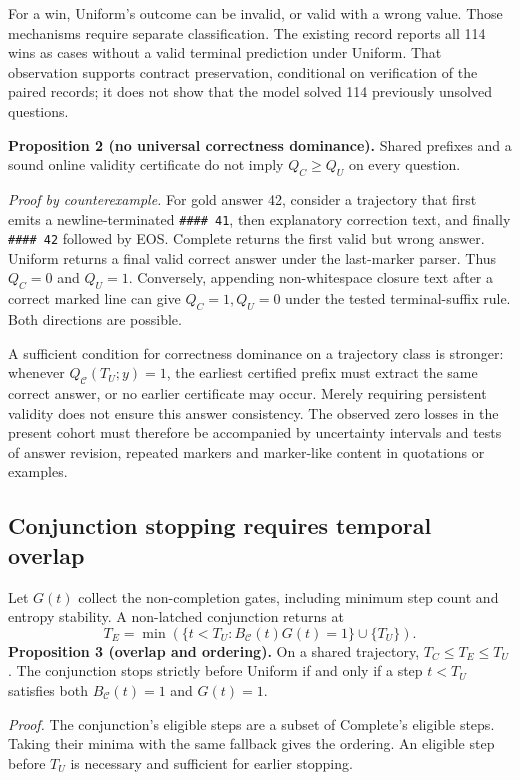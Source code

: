 \documentclass[12pt,a4paper]{article}
\begin{document}
For a win, Uniform's outcome can be invalid, or valid with a wrong value. Those mechanisms require separate classification. The existing record reports all 114 wins as cases without a valid terminal prediction under Uniform. That observation supports contract preservation, conditional on verification of the paired records; it does not show that the model solved 114 previously unsolved questions.

\textbf{Proposition 2 (no universal correctness dominance).} Shared prefixes and a sound online validity certificate do not imply $Q_C\geq Q_U$ on every question.

\emph{Proof by counterexample.} For gold answer 42, consider a trajectory that first emits a newline-terminated \texttt{\#\#\#\# 41}, then explanatory correction text, and finally \texttt{\#\#\#\# 42} followed by EOS. Complete returns the first valid but wrong answer. Uniform returns a final valid correct answer under the last-marker parser. Thus $Q_C=0$ and $Q_U=1$. Conversely, appending non-whitespace closure text after a correct marked line can give $Q_C=1,Q_U=0$ under the tested terminal-suffix rule. Both directions are possible.

A sufficient condition for correctness dominance on a trajectory class is stronger: whenever $Q_{\mathcal C}(T_U;y)=1$, the earliest certified prefix must extract the same correct answer, or no earlier certificate may occur. Merely requiring persistent validity does not ensure this answer consistency. The observed zero losses in the present cohort must therefore be accompanied by uncertainty intervals and tests of answer revision, repeated markers and marker-like content in quotations or examples.

\subsection{Conjunction stopping requires temporal overlap}
Let $G(t)$ collect the non-completion gates, including minimum step count and entropy stability. A non-latched conjunction returns at
\begin{equation}
 T_E=\min\left(\{t<T_U:B_{\mathcal C}(t)G(t)=1\}\cup\{T_U\}\right).
\end{equation}
\textbf{Proposition 3 (overlap and ordering).} On a shared trajectory, $T_C\leq T_E\leq T_U$. The conjunction stops strictly before Uniform if and only if a step $t<T_U$ satisfies both $B_{\mathcal C}(t)=1$ and $G(t)=1$.

\emph{Proof.} The conjunction's eligible steps are a subset of Complete's eligible steps. Taking their minima with the same fallback gives the ordering. An eligible step before $T_U$ is necessary and sufficient for earlier stopping.
\end{document}
